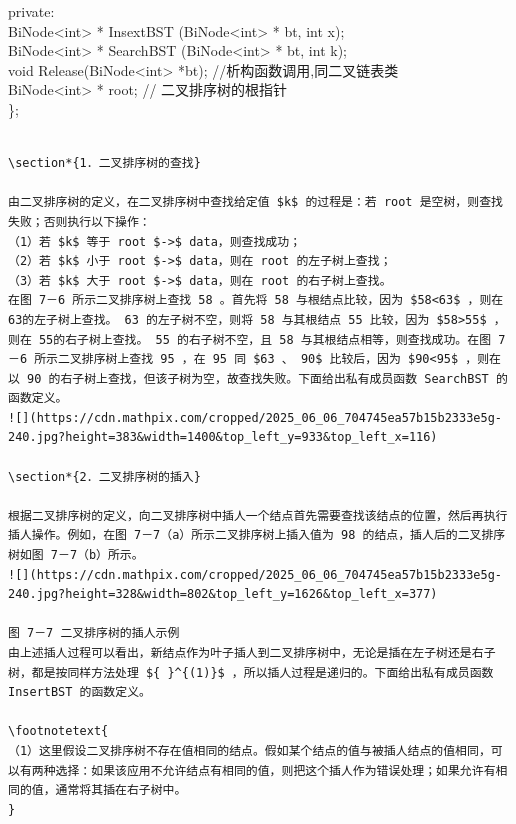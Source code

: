 \documentclass[10pt]{article}
\let\svthefootnote\thefootnote
\newcommand\blfootnotetext[1]{%
  \let\thefootnote\relax\footnote{#1}%
  \addtocounter{footnote}{-1}%
  \let\thefootnote\svthefootnote%
}
\let\svfootnotetext\footnotetext
\renewcommand\footnotetext[2][?]{%
  \if\relax#1\relax%
    \ifnum\value{footnote}=0\blfootnotetext{#2}\else\svfootnotetext{#2}\fi%
  \else%
    \if?#1\ifnum\value{footnote}=0\blfootnotetext{#2}\else\svfootnotetext{#2}\fi%
    \else\svfootnotetext[#1]{#2}\fi%
  \fi
}
\begin{document}
private:\\
BiNode<int> * InsextBST (BiNode<int> * bt, int x);\\
BiNode<int> * SearchBST (BiNode<int> * bt, int k);\\
void Release(BiNode<int> *bt); //析构函数调用,同二叉链表类\\
BiNode<int> * root; // 二叉排序树的根指针\\
\};

\begin{verbatim}

\section*{1．二叉排序树的查找}

由二叉排序树的定义，在二叉排序树中查找给定值 $k$ 的过程是：若 root 是空树，则查找失败；否则执行以下操作：
（1）若 $k$ 等于 root $->$ data，则查找成功；
（2）若 $k$ 小于 root $->$ data，则在 root 的左子树上查找；
（3）若 $k$ 大于 root $->$ data，则在 root 的右子树上查找。
在图 7－6 所示二叉排序树上查找 58 。首先将 58 与根结点比较，因为 $58<63$ ，则在 63的左子树上查找。 63 的左子树不空，则将 58 与其根结点 55 比较，因为 $58>55$ ，则在 55的右子树上查找。 55 的右子树不空，且 58 与其根结点相等，则查找成功。在图 7－6 所示二叉排序树上查找 95 ，在 95 同 $63 、 90$ 比较后，因为 $90<95$ ，则在以 90 的右子树上查找，但该子树为空，故查找失败。下面给出私有成员函数 SearchBST 的函数定义。
![](https://cdn.mathpix.com/cropped/2025_06_06_704745ea57b15b2333e5g-240.jpg?height=383&width=1400&top_left_y=933&top_left_x=116)

\section*{2．二叉排序树的插入}

根据二叉排序树的定义，向二叉排序树中插人一个结点首先需要查找该结点的位置，然后再执行插人操作。例如，在图 7－7（a）所示二叉排序树上插入值为 98 的结点，插人后的二叉排序树如图 7－7（b）所示。
![](https://cdn.mathpix.com/cropped/2025_06_06_704745ea57b15b2333e5g-240.jpg?height=328&width=802&top_left_y=1626&top_left_x=377)

图 7－7 二叉排序树的插人示例
由上述插人过程可以看出，新结点作为叶子插人到二叉排序树中，无论是插在左子树还是右子树，都是按同样方法处理 ${ }^{(1)}$ ，所以插人过程是递归的。下面给出私有成员函数 InsertBST 的函数定义。

\footnotetext{
（1）这里假设二叉排序树不存在值相同的结点。假如某个结点的值与被插人结点的值相同，可以有两种选择：如果该应用不允许结点有相同的值，则把这个插人作为错误处理；如果允许有相同的值，通常将其插在右子树中。
}
\end{verbatim}
\end{document}
